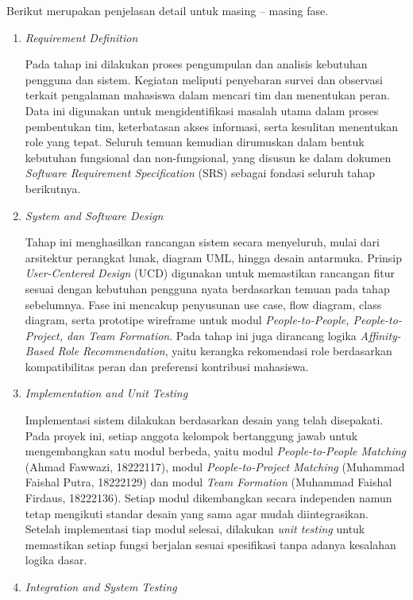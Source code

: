 Berikut merupakan penjelasan detail untuk masing – masing fase.
\begin{enumerate}
\item \textit{Requirement Definition}

Pada tahap ini dilakukan proses pengumpulan dan analisis kebutuhan pengguna dan sistem. Kegiatan meliputi penyebaran survei dan observasi terkait pengalaman mahasiswa dalam mencari tim dan menentukan peran. Data ini digunakan untuk mengidentifikasi masalah utama dalam proses pembentukan tim, keterbatasan akses informasi, serta kesulitan menentukan role yang tepat. Seluruh temuan kemudian dirumuskan dalam bentuk kebutuhan fungsional dan non-fungsional, yang disusun ke dalam dokumen \textit{Software Requirement Specification} (SRS) sebagai fondasi seluruh tahap berikutnya.

\item \textit{System and Software Design}

Tahap ini menghasilkan rancangan sistem secara menyeluruh, mulai dari arsitektur perangkat lunak, diagram UML, hingga desain antarmuka. Prinsip \textit{User-Centered Design} (UCD) digunakan untuk memastikan rancangan fitur sesuai dengan kebutuhan pengguna nyata berdasarkan temuan pada tahap sebelumnya. Fase ini mencakup penyusunan use case, flow diagram, class diagram, serta prototipe wireframe untuk modul \textit{People-to-People, People-to-Project, dan Team Formation}. Pada tahap ini juga dirancang logika \textit{Affinity-Based Role Recommendation}, yaitu kerangka rekomendasi role berdasarkan kompatibilitas peran dan preferensi kontribusi mahasiswa.

\item \textit{Implementation and Unit Testing}

Implementasi sistem dilakukan berdasarkan desain yang telah disepakati. Pada proyek ini, setiap anggota kelompok bertanggung jawab untuk mengembangkan satu modul berbeda, yaitu modul \textit{People-to-People Matching} (Ahmad Fawwazi, 18222117), modul \textit{People-to-Project Matching} (Muhammad Faishal Putra, 18222129) dan modul \textit{Team Formation} (Muhammad Faishal Firdaus, 18222136). Setiap modul dikembangkan secara independen namun tetap mengikuti standar desain yang sama agar mudah diintegrasikan. Setelah implementasi tiap modul selesai, dilakukan \textit{unit testing} untuk memastikan setiap fungsi berjalan sesuai spesifikasi tanpa adanya kesalahan logika dasar.

\item \textit{Integration and System Testing}


\end{enumerate}
